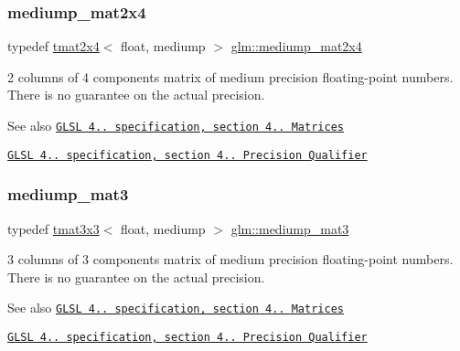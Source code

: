 \subsubsection{\texorpdfstring{mediump\+\_\+mat2x4}{mediump\_mat2x4}}
{\footnotesize\ttfamily typedef \hyperlink{structglm_1_1tmat2x4}{tmat2x4}$<$ float, mediump $>$ \hyperlink{group__core__precision_ga61617ba8393bbebc94ee813403aa54a9}{glm\+::mediump\+\_\+mat2x4}}

2 columns of 4 components matrix of medium precision floating-\/point numbers. There is no guarantee on the actual precision.

\begin{DoxySeeAlso}{See also}
\href{http://www.opengl.org/registry/doc/GLSLangSpec.4.20.8.pdf}{\tt G\+L\+SL 4.. specification, section 4.. Matrices} 

\href{http://www.opengl.org/registry/doc/GLSLangSpec.4.20.8.pdf}{\tt G\+L\+SL 4.. specification, section 4.. Precision Qualifier} 
\end{DoxySeeAlso}
\mbox{\label{group__core__precision_ga59f8b29bbf809530ab4c0ee97d03a4f9}} 
\subsubsection{\texorpdfstring{mediump\+\_\+mat3}{mediump\_mat3}}
{\footnotesize\ttfamily typedef \hyperlink{structglm_1_1tmat3x3}{tmat3x3}$<$ float, mediump $>$ \hyperlink{group__core__precision_ga59f8b29bbf809530ab4c0ee97d03a4f9}{glm\+::mediump\+\_\+mat3}}

3 columns of 3 components matrix of medium precision floating-\/point numbers. There is no guarantee on the actual precision.

\begin{DoxySeeAlso}{See also}
\href{http://www.opengl.org/registry/doc/GLSLangSpec.4.20.8.pdf}{\tt G\+L\+SL 4.. specification, section 4.. Matrices} 

\href{http://www.opengl.org/registry/doc/GLSLangSpec.4.20.8.pdf}{\tt G\+L\+SL 4.. specification, section 4.. Precision Qualifier} 
\end{DoxySeeAlso}
\mbox{\label{group__core__precision_ga2237b9bb71ea5b0d2ae07f9315ccdc28}} 
